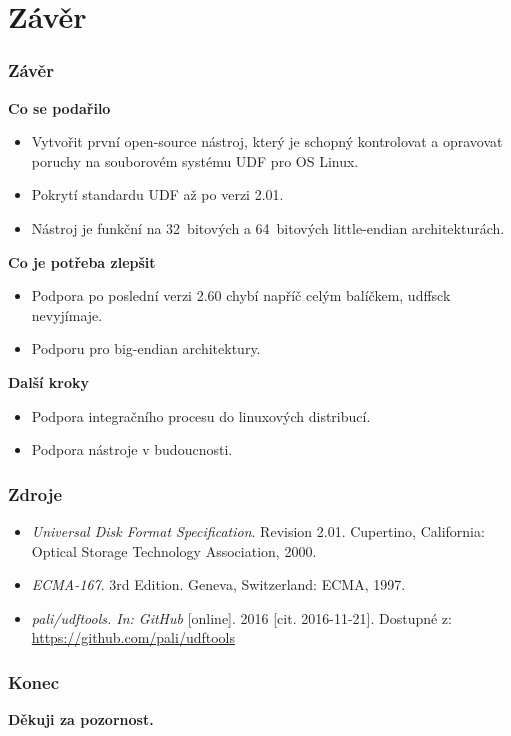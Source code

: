 \documentclass[aspectratio=169]{beamer}
\begin{document}
    \section{Závěr}
		\begin{frame}
			\frametitle{Závěr}
			\vspace{40 pt}
			\Large\textbf{Co se podařilo}
			\begin{itemize}
				\item\large Vytvořit první open-source nástroj, který je schopný kontrolovat a opravovat poruchy na souborovém systému UDF pro OS Linux.
				\item\large Pokrytí standardu UDF až po verzi 2.01.
				\item\large Nástroj je funkční na 32~bitových a 64~bitových little-endian architekturách.
			\end{itemize}
			\Large\textbf{Co je potřeba zlepšit}
			\begin{itemize}
				\item\large Podpora po poslední verzi 2.60 chybí napříč celým balíčkem, udffsck nevyjímaje.
				\item\large Podporu pro big-endian architektury.
			\end{itemize}
			\Large\textbf{Další kroky}
			\begin{itemize}
				\item\large Podpora integračního procesu do linuxových distribucí.
                \item\large Podpora nástroje v budoucnosti.
			\end{itemize}
		\end{frame}
	    
        \begin{frame}
			\frametitle{Zdroje}
			\vspace{40 pt}
            \begin{itemize}
                \item\emph{Universal Disk Format Specification}. Revision 2.01. Cupertino, California: Optical Storage Technology Association, 2000.
                \item\emph{ECMA-167}. 3rd Edition. Geneva, Switzerland: ECMA, 1997.
                \item\emph{pali/udftools. In: GitHub}\/ [online]. 2016 [cit. 2016-11-21]. Dostupné z: \url{https://github.com/pali/udftools}
            \end{itemize}
		\end{frame}

		\begin{frame}
			\frametitle{Konec}
			\center
			\vspace{40 pt}
			\Huge\textbf{Děkuji za pozornost.}
		\end{frame}
\end{document}
